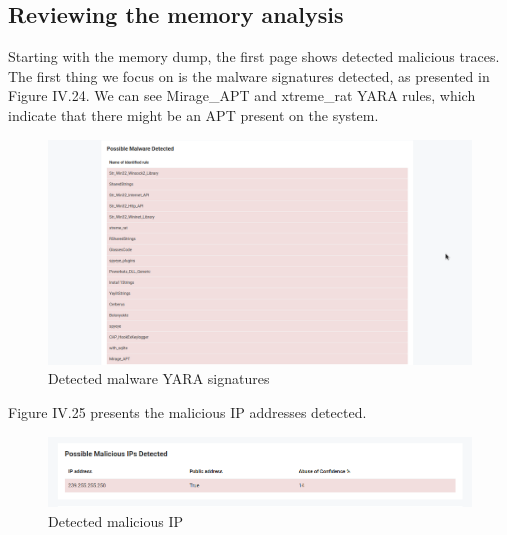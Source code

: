 \subsection{Reviewing the memory analysis}
Starting with the memory dump, the first page shows detected malicious traces. The first thing we focus on is the malware signatures detected, as presented in Figure IV.24. We can see Mirage\_APT and xtreme\_rat YARA rules, which indicate that there might be an APT present on the system.
\begin{figure}[H]
\centering
\includegraphics[width=0.9\columnwidth]{Figures/24.png}
\caption{Detected malware YARA signatures}
\end{figure}
Figure IV.25 presents the malicious IP addresses detected.
\begin{figure}[H]
\centering
\includegraphics[width=0.9\columnwidth]{Figures/25.png}
\caption{Detected malicious IP}
\end{figure}
